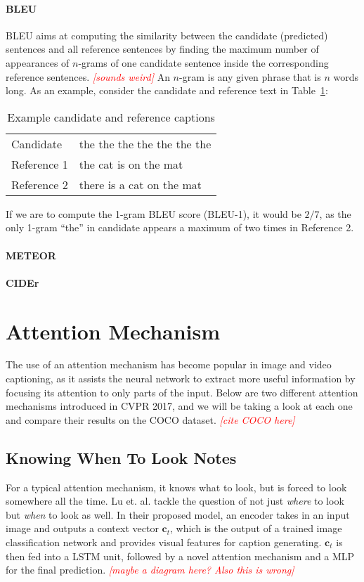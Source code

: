 \documentclass[10pt,twocolumn,letterpaper]{article}
\newcommand{\todo}[1]{\textcolor{red}{{\em [#1]}} }
\newcommand{\tabref}[1]{Table~\ref{tab:#1}}
\begin{document}
\paragraph{BLEU}
BLEU aims at computing the similarity between the candidate (predicted)
sentences and all reference sentences by finding the maximum number of
appearances of $n$-grams of one candidate sentence inside the corresponding
reference sentences.  \todo{sounds weird} An $n$-gram is any given phrase that
is $n$ words long. As an example, consider the candidate and reference text in
\tabref{captions}:
%
\begin{table}[]
\centering
\caption{Example candidate and reference captions}
\label{tab:captions}
\begin{tabular}{ll}
	Candidate   & the the the the the the the \\
	Reference 1 & the cat is on the mat       \\
  Reference 2 & there is a cat on the mat  
\end{tabular}
\end{table}
%
If we are to compute the 1-gram BLEU score (BLEU-1), it would be $2/7$, as the
only 1-gram ``the'' in candidate appears a maximum of two times in Reference
2. 

\paragraph{METEOR}


\paragraph{CIDEr}

\section{Attention Mechanism}

The use of an attention mechanism has become popular in image and video
captioning, as it assists the neural network to extract more useful
information by focusing its attention to only parts of the input. Below are
two different attention mechanisms introduced in CVPR 2017, and we will be
taking a look at each one and compare their results on the COCO dataset.
\todo{cite COCO here}

\subsection{Knowing When To Look Notes}
For a typical attention mechanism, it knows what to look, but is forced to look
somewhere all the time. Lu et. al. tackle the question of not just
\textit{where} to look but \textit{when} to look as well. In their proposed
model, an encoder takes in an input image and outputs a context vector
$\boldsymbol{c}_t$, which is the output of a trained image classification network
and provides visual features for caption generating. $\boldsymbol{c}_t$ is then
fed into a LSTM unit, followed by a novel attention mechanism and a MLP for the
final prediction. \todo{maybe a diagram here? Also this is wrong}
\end{document}
